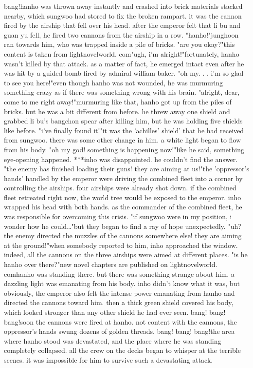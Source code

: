 bang!hanho was thrown away instantly and crashed into brick materials stacked nearby, which sungwoo had stored to fix the broken rampart.
it was the cannon fired by the airship that fell over his head.
 after the emperor felt that li bu and guan yu fell, he fired two cannons from the airship in a row.
"hanho!"junghoon ran towards him, who was trapped inside a pile of bricks.
"are you okay?"this content is taken from lightnovelworld.
com"ugh, i'm alright!"fortunately, hanho wasn't killed by that attack.
 as a matter of fact, he emerged intact even after he was hit by a guided bomb fired by admiral william baker.
"oh my.
.
.
i'm so glad to see you here!"even though hanho was not wounded, he was murmuring something crazy as if there was something wrong with his brain.
 "alright, dear, come to me right away!"murmuring like that, hanho got up from the piles of bricks.
but he was a bit different from before.
 he threw away one shield and grabbed li bu's bangchon spear after killing him, but he was holding five shields like before.
"i've finally found it!"it was the 'achilles' shield' that he had received from sungwoo.
 there was some other change in him.
 a white light began to flow from his body.
"oh my god! something is happening now!"like he said, something eye-opening happened.
***inho was disappointed.
 he couldn't find the answer.
"the enemy has finished loading their guns! they are aiming at us!"the 'oppressor's hands' handled by the emperor were driving the combined fleet into a corner by controlling the airships.
 four airships were already shot down.
if the combined fleet retreated right now, the world tree would be exposed to the emperor.
inho wrapped his head with both hands.
 as the commander of the combined fleet, he was responsible for overcoming this crisis.
"if sungwoo were in my position, i wonder how he could…"but they began to find a ray of hope unexpectedly.
"uh? the enemy directed the muzzles of the cannons somewhere else! they are aiming at the ground!"when somebody reported to him, inho approached the window.
 indeed, all the cannons on the three airships were aimed at different places.
"is he hanho over there?"new novel chapters are published on lightnovelworld.
comhanho was standing there.
 but there was something strange about him.
 a dazzling light was emanating from his body.
inho didn't know what it was, but obviously, the emperor also felt the intense power emanating from hanho and directed the cannons toward him.
then a thick green shield covered his body, which looked stronger than any other shield he had ever seen.
bang! bang! bang!soon the cannons were fired at hanho.
 not content with the cannons, the oppressor's hands swung dozens of golden threads.
bang! bang! bang!the area where hanho stood was devastated, and the place where he was standing completely collapsed.
all the crew on the decks began to whisper at the terrible scenes.
 it was impossible for him to survive such a devastating attack.


